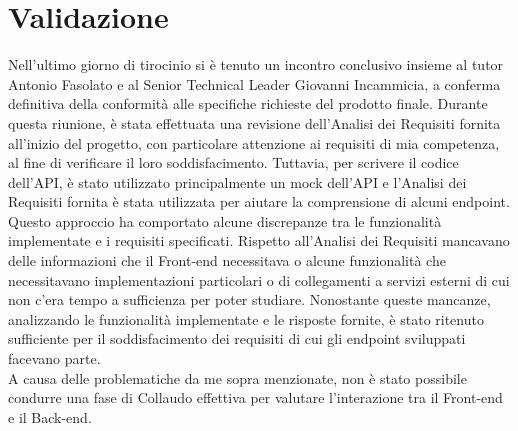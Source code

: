 \section{Validazione}
Nell’ultimo giorno di tirocinio si è tenuto un incontro conclusivo insieme al tutor Antonio Fasolato e al Senior Technical Leader Giovanni Incammicia, a conferma definitiva della conformità alle specifiche richieste del prodotto finale. Durante questa riunione, è stata effettuata una revisione dell'Analisi dei Requisiti fornita all'inizio del progetto, con particolare attenzione ai requisiti di mia competenza, al fine di verificare il loro soddisfacimento. Tuttavia, per scrivere il codice dell’API, è stato utilizzato principalmente un mock dell’API e l’Analisi dei Requisiti fornita è stata utilizzata per aiutare la comprensione di alcuni endpoint. Questo approccio ha comportato alcune discrepanze tra le funzionalità implementate e i requisiti specificati. Rispetto all’Analisi dei Requisiti mancavano delle informazioni che il Front-end necessitava o alcune funzionalità che necessitavano implementazioni particolari o di collegamenti a servizi esterni di cui non c’era tempo a sufficienza per poter studiare. Nonostante queste mancanze, analizzando le funzionalità implementate e le risposte fornite, è stato ritenuto sufficiente per il soddisfacimento dei requisiti di cui gli endpoint sviluppati facevano parte.\\
A causa delle problematiche da me sopra menzionate, non è stato possibile condurre una fase di Collaudo effettiva per valutare l'interazione tra il Front-end e il Back-end.